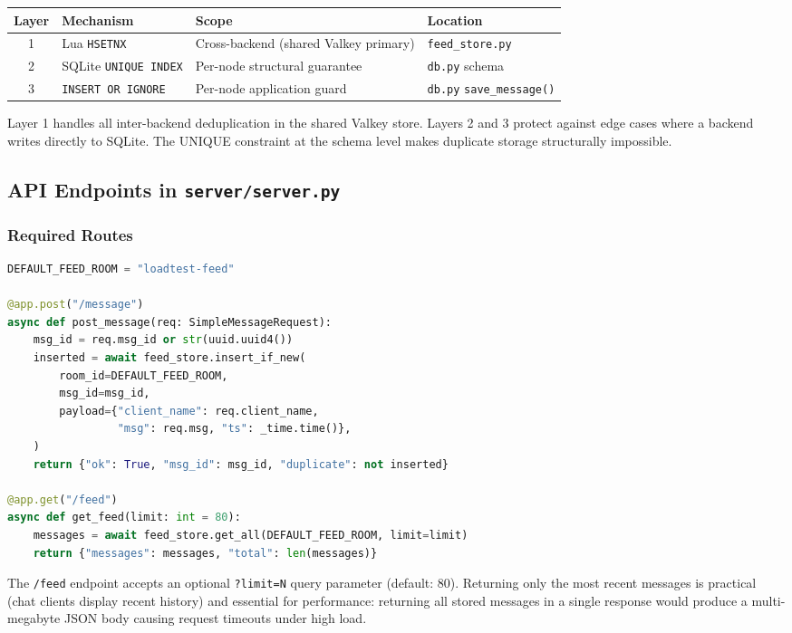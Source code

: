 \documentclass[12pt,a4paper]{article}
\begin{document}
\begin{center}
\begin{tabular}{clll}
\toprule
\textbf{Layer} & \textbf{Mechanism} & \textbf{Scope} & \textbf{Location} \\
\midrule
1 & Lua \texttt{HSETNX} & Cross-backend (shared Valkey primary) & \texttt{feed\_store.py} \\
2 & SQLite \texttt{UNIQUE INDEX} & Per-node structural guarantee & \texttt{db.py} schema \\
3 & \texttt{INSERT OR IGNORE} & Per-node application guard & \texttt{db.py} \texttt{save\_message()} \\
\bottomrule
\end{tabular}
\end{center}

Layer 1 handles all inter-backend deduplication in the shared Valkey store. Layers 2 and 3 protect against edge cases where a backend writes directly to SQLite. The UNIQUE constraint at the schema level makes duplicate storage structurally impossible.

\subsection{API Endpoints in \texttt{server/server.py}}

\subsubsection{Required Routes}

\begin{lstlisting}[language=Python, caption={POST /message and GET /feed endpoints}]
DEFAULT_FEED_ROOM = "loadtest-feed"

@app.post("/message")
async def post_message(req: SimpleMessageRequest):
    msg_id = req.msg_id or str(uuid.uuid4())
    inserted = await feed_store.insert_if_new(
        room_id=DEFAULT_FEED_ROOM,
        msg_id=msg_id,
        payload={"client_name": req.client_name,
                 "msg": req.msg, "ts": _time.time()},
    )
    return {"ok": True, "msg_id": msg_id, "duplicate": not inserted}

@app.get("/feed")
async def get_feed(limit: int = 80):
    messages = await feed_store.get_all(DEFAULT_FEED_ROOM, limit=limit)
    return {"messages": messages, "total": len(messages)}
\end{lstlisting}

The \texttt{/feed} endpoint accepts an optional \texttt{?limit=N} query parameter (default: 80). Returning only the most recent messages is practical (chat clients display recent history) and essential for performance: returning all stored messages in a single response would produce a multi-megabyte JSON body causing request timeouts under high load.
\end{document}
